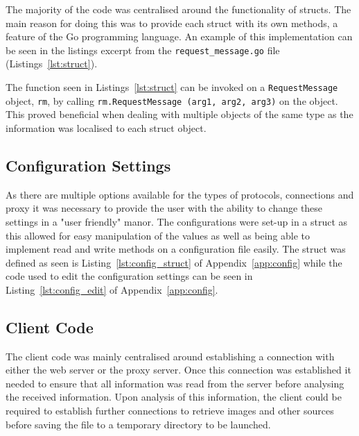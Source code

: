 \documentclass[10pt,twocolumn]{witseiepaper}
\begin{document}
		The majority of the code was centralised around the functionality of structs. The main reason for doing this was to provide each struct with its own methods, a feature of the Go programming language. An example of this implementation can be seen in the listings excerpt from the \texttt{request\_message.go} file (Listings~\ref{lst:struct}). 
		
		
		
		The function seen in Listings~\ref{lst:struct} can be invoked on a \texttt{RequestMessage} object, \texttt{rm}, by calling \texttt{rm.RequestMessage (arg1, arg2, arg3)} on the object. This proved beneficial when dealing with multiple objects of the same type as the information was localised to each struct object. \\
		
	\subsection{Configuration Settings}
		
		As there are multiple options available for the types of protocols, connections and proxy it was necessary to provide the user with the ability to change these settings in a "user friendly" manor. The configurations were set-up in a struct as this allowed for easy manipulation of the values as well as being able to implement read and write methods on a configuration file easily. The struct was defined as seen is Listing~\ref{lst:config_struct} of Appendix~\ref{app:config} while the code used to edit the configuration settings can be seen in Listing~\ref{lst:config_edit} of Appendix~\ref{app:config}. 
		
		
	\subsection{Client Code}
		
		The client code was mainly centralised around establishing a connection with either the web server or the proxy server. Once this connection was established it needed to ensure that all information was read from the server before analysing the received information. Upon analysis of this information, the client could be required to establish further connections to retrieve images and other sources before saving the file to a temporary directory to be launched. \\
		
\end{document}
